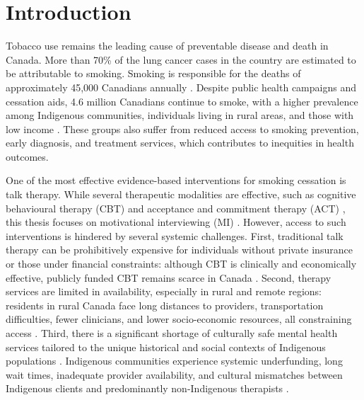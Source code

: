 \chapter{Introduction}


Tobacco use remains the leading cause of preventable disease and death in Canada. More than 70\% of the lung cancer cases in the country are estimated to be attributable to smoking. Smoking is responsible for the deaths of approximately 45,000 Canadians annually \citep{poirier2019estimates}. Despite public health campaigns and cessation aids, 4.6 million Canadians continue to smoke, with a higher prevalence among Indigenous communities, individuals living in rural areas, and those with low income \cite{cpac2020lung}. These groups also suffer from reduced access to smoking prevention, early diagnosis, and treatment services, which contributes to inequities in health outcomes.

One of the most effective evidence-based interventions for smoking cessation is talk therapy. While several therapeutic modalities are effective, such as cognitive behavioural therapy (CBT) \cite{beck2011cognitive} and acceptance and commitment therapy (ACT) \cite{hayes1999acceptance}, this thesis focuses on motivational interviewing (MI) \cite{miller2012motivational}. However, access to such interventions is hindered by several systemic challenges. First, traditional talk therapy can be prohibitively expensive for individuals without private insurance or those under financial constraints: although CBT is clinically and economically effective, publicly funded CBT remains scarce in Canada \cite{llewellyn2017economic}. Second, therapy services are limited in availability, especially in rural and remote regions: residents in rural Canada face long distances to providers, transportation difficulties, fewer clinicians, and lower socio-economic resources, all constraining access \cite{crosato2011rural}. Third, there is a significant shortage of culturally safe mental health services tailored to the unique historical and social contexts of Indigenous populations \cite{jones2021mental}. Indigenous communities experience systemic underfunding, long wait times, inadequate provider availability, and cultural mismatches between Indigenous clients and predominantly non-Indigenous therapists \cite{firstnationshealth2023, turner2018poverty}.



